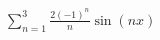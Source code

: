 \documentclass[preview]{standalone}
\begin{document}
\begin{center}
$\sum_{n=1}^{3} \frac{2(-1)^n}{n} \sin(nx)$
\end{center}
\end{document}

